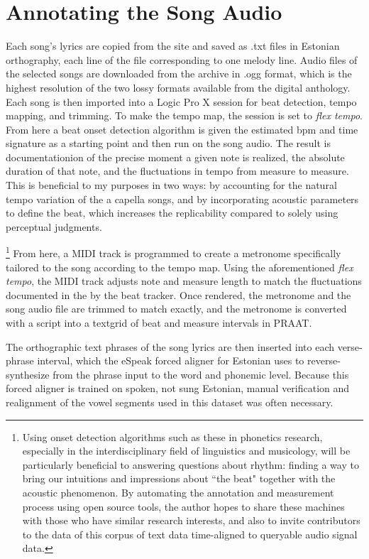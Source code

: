 \section{Annotating the Song Audio }

 Each song's lyrics are copied from the site and saved as .txt files in Estonian orthography, each line of the file corresponding to one melody line.  
Audio files of the selected songs are downloaded from the archive in .ogg format, which is the highest resolution of the two lossy formats available from the digital anthology. Each song is then imported into a Logic Pro X \citep{logic2014} session for beat detection, tempo mapping, and trimming. 
To make the tempo map, the session is set to {\it flex tempo}. From here a beat onset detection algorithm is  given the estimated bpm and time signature as a starting point and then run on the song audio. 
The result is documentationion of the precise moment a given note is realized, the absolute duration of that note, and the fluctuations in tempo from measure to measure.
This is beneficial to my purposes in two ways: by accounting for the natural tempo variation of the a capella songs, and by incorporating acoustic parameters to define the beat, which increases the replicability compared to solely using perceptual judgments. 

\footnote{Using onset detection algorithms such as these \citep{bKeeper2007} in phonetics research, especially in the interdisciplinary field of linguistics and musicology, will be particularly beneficial to answering questions about rhythm: finding a way to bring our intuitions and impressions about ``the beat" together with the acoustic phenomenon. By automating the annotation and measurement process using open source tools, the author hopes to share these machines with those who have similar research interests, and also to invite contributors to the data of this corpus of text data time-aligned to queryable audio signal data. } 
From here, a MIDI track is programmed to create a metronome specifically tailored to the song according to the tempo map. Using the aforementioned {\it flex tempo}, the MIDI track adjusts note and measure length to match the fluctuations documented in the by the beat tracker. Once rendered, the metronome and the song audio file are trimmed to match exactly, and the metronome is converted with a script into a textgrid of beat and measure intervals in PRAAT\citep{boersna2022}. 

 
The orthographic text phrases of the song lyrics are then inserted into each verse-phrase interval, which the eSpeak forced aligner for Estonian \citep{eSpeak1995} uses to reverse-synthesize from the phrase input to the word and phonemic level. Because this forced aligner is trained on spoken, not sung Estonian, manual verification and realignment of the vowel segments used in this dataset was often necessary. \\

